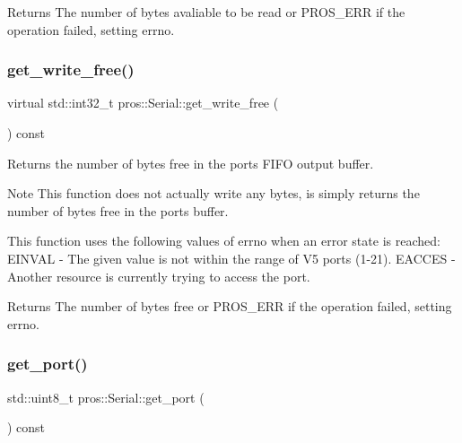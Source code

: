 \begin{DoxyReturn}{Returns}
The number of bytes avaliable to be read or P\+R\+O\+S\+\_\+\+E\+RR if the operation failed, setting errno. 
\end{DoxyReturn}
\mbox{\label{classpros_1_1Serial_a08daf4a3df3e3c4924d66d0b2eb91538}} 
\subsubsection{\texorpdfstring{get\+\_\+write\+\_\+free()}{get\_write\_free()}}
{\footnotesize\ttfamily virtual std\+::int32\+\_\+t pros\+::\+Serial\+::get\+\_\+write\+\_\+free (\begin{DoxyParamCaption}{ }\end{DoxyParamCaption}) const\hspace{0.3cm}{\ttfamily [virtual]}}



Returns the number of bytes free in the port\textquotesingle{}s F\+I\+FO output buffer. 

\begin{DoxyNote}{Note}
This function does not actually write any bytes, is simply returns the number of bytes free in the port\textquotesingle{}s buffer.
\end{DoxyNote}
This function uses the following values of errno when an error state is reached\+: E\+I\+N\+V\+AL -\/ The given value is not within the range of V5 ports (1-\/21). E\+A\+C\+C\+ES -\/ Another resource is currently trying to access the port.

\begin{DoxyReturn}{Returns}
The number of bytes free or P\+R\+O\+S\+\_\+\+E\+RR if the operation failed, setting errno. 
\end{DoxyReturn}
\mbox{\label{classpros_1_1Serial_a74560cbf9ec7bc3f49cbf54aadb049a9}} 
\subsubsection{\texorpdfstring{get\+\_\+port()}{get\_port()}}
{\footnotesize\ttfamily std\+::uint8\+\_\+t pros\+::\+Serial\+::get\+\_\+port (\begin{DoxyParamCaption}{ }\end{DoxyParamCaption}) const}



